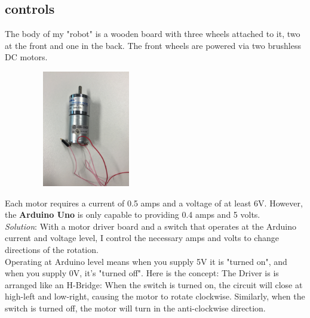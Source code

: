 \documentclass[final,3p,times]{article}
\begin{document}
\subsection{controls}
The body of my "robot" is a wooden board with three wheels attached to it, two at the front and one in the back.
The front wheels are powered via two brushless DC motors.
\begin{figure}
\includegraphics[trim={5cm 30cm 25cm 10cm}, clip, width=2in, height=2in]{./media/motor.jpg}
\end{figure}
Each motor requires a current of 0.5 amps and a voltage of at least 6V.
However, the \textbf{Arduino Uno} is only capable to providing 0.4 amps and 5 volts.\\
\textit{Solution}:
With a motor driver board and a switch that operates at the Arduino current and voltage level,  I control the necessary amps and volts to change directions of the rotation.\\
Operating at Arduino level means when you supply 5V it is "turned on", and when you supply 0V, it's "turned off".
Here is the concept: The Driver is is arranged like an H-Bridge:
When the switch is turned on, the circuit will close at high-left and low-right, causing the motor to rotate clockwise. Similarly, when the switch is turned off, the motor will turn in the anti-clockwise direction.
\end{document}
